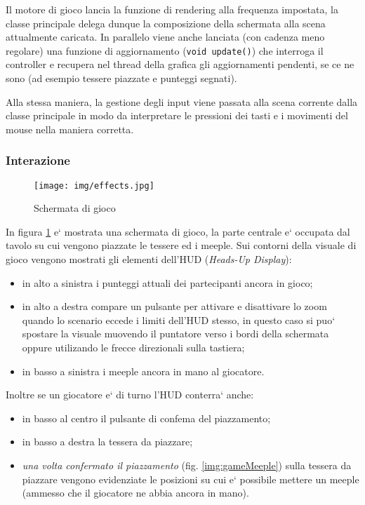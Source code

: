 Il motore di gioco lancia la funzione di rendering alla frequenza impostata, la classe principale
delega dunque la composizione della schermata alla scena attualmente caricata.
In parallelo viene anche lanciata (con cadenza meno regolare) una funzione di aggiornamento (\texttt{void update()}) che interroga il controller e recupera nel thread della grafica gli aggiornamenti pendenti, se ce ne sono (ad esempio tessere piazzate e punteggi segnati).

Alla stessa maniera, la gestione degli input viene passata alla scena corrente dalla classe principale in modo da interpretare le pressioni dei tasti e i movimenti del mouse nella maniera corretta.

\subsubsection{Interazione}
\begin{figure}[htbp]
	\texttt{[image: img/effects.jpg]}
	\caption{Schermata di gioco}
	\label{img:game}
\end{figure}

In figura \ref{img:game} e` mostrata una schermata di gioco, la parte centrale e` occupata dal tavolo su cui vengono piazzate le tessere ed i meeple. 
Sui contorni della visuale di gioco vengono mostrati gli elementi dell'HUD (\emph{Heads-Up Display}): 
\begin{itemize}
\item in alto a sinistra i punteggi attuali dei partecipanti ancora in gioco;
\item in alto a destra compare un pulsante per attivare e disattivare lo zoom quando lo scenario eccede i limiti dell'HUD stesso, in questo caso si puo` spostare la visuale muovendo il puntatore verso i bordi della schermata oppure utilizando le frecce direzionali sulla tastiera;
\item in basso a sinistra i meeple ancora in mano al giocatore.
\end{itemize}
Inoltre se un giocatore e` di turno l'HUD conterra` anche:
\begin{itemize}
\item in basso al centro il pulsante di confema del piazzamento;
\item in basso a destra la tessera da piazzare;
\item \emph{una volta confermato il piazzamento} (fig. \ref{img:gameMeeple}) sulla tessera da piazzare vengono evidenziate le posizioni su cui e` possibile mettere un meeple (ammesso che il giocatore ne abbia ancora in mano).
\end{itemize}

